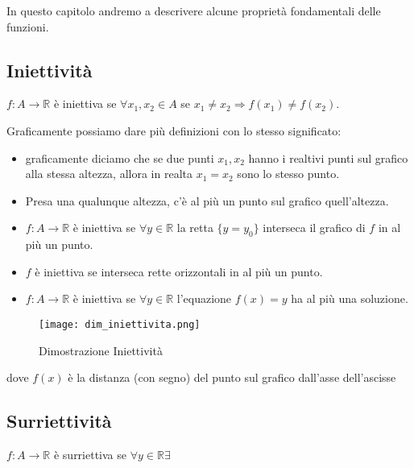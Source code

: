 \documentclass[../main.tex, class=article, 12pt]{subfiles}
\begin{document}
In questo capitolo andremo a descrivere alcune proprietà fondamentali delle funzioni.



\subsection{Iniettività}\label{sec:iniettività}
\begin{definition}
        $ f : A \to \mathbb{R} $ è iniettiva se $ \forall x_1,x_2 \in A $ se $ x_1 \not = x_2 \Rightarrow f(x_1) \not = f(x_2) $.
\end{definition}

\begin{definition}
        Graficamente possiamo dare più definizioni con lo stesso significato:
\begin{itemize}
        \item  graficamente diciamo che se due punti $ x_1,x_2 $ hanno i realtivi punti sul grafico alla stessa altezza, allora in realta $x_1 = x_2$ sono lo stesso punto.
        \item Presa una qualunque altezza, c'è al più un punto sul grafico quell'altezza. \par
        \item  $ f : A \to \mathbb{R} $ è iniettiva se $ \forall y \in \mathbb{R} $ la retta $ \{y = y_0\} $ interseca il grafico di $ f $ in al più un punto. 
        \item $ f $ è iniettiva se interseca rette orizzontali in al più un punto. 
        \item $ f : A \to \mathbb{R} $ è iniettiva se $ \forall y \in \mathbb{R} $ l'equazione $ f(x) = y $ ha al più una soluzione.
\end{itemize}

\begin{figure}[H]
  	\texttt{[image: dim\_iniettivita.png]}
  	\caption{Dimostrazione Iniettività}
        \label{fig:dim_iniettivita}
\end{figure}
\end{definition}


dove $ f(x) $ è la distanza (con segno) del punto sul grafico dall'asse dell'ascisse



\subsection{Surriettività}\label{sec:surriettività}
\begin{definition}
        $ f: A \to \mathbb{R} $ è surriettiva se $ \forall y \in \mathbb{R} \exists $ 
\end{definition}
\end{document}
